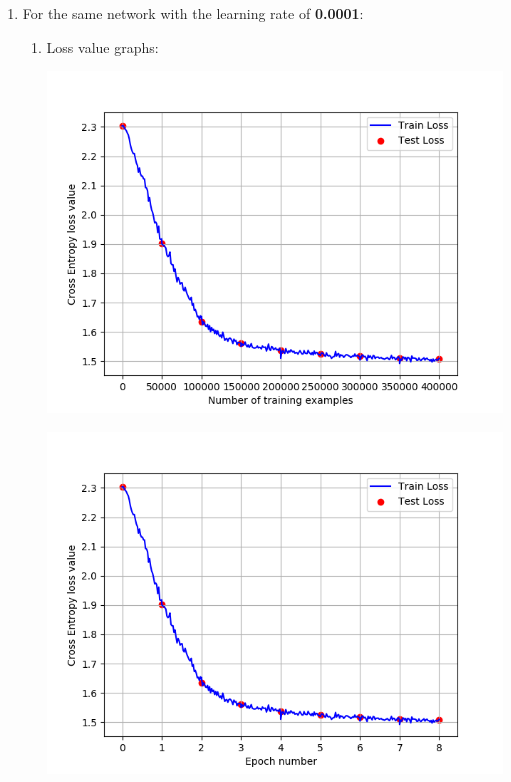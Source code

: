 \documentclass[a4paper]{iacas}
\begin{document}
\begin{enumerate}
\begin{enumerate}
\end{enumerate}

\item For the same network with the learning rate of \textbf{0.0001}:


\begin{enumerate}

\item Loss value graphs:

\vskip 0.1in
\begin{minipage}{\linewidth}
	\includegraphics[scale=0.8]{hw2_py/results/_14_01_43/lr_0_0001_net_1_CE_/loss_value.png}
	\label{fig_9}
\end{minipage}
\vskip 0.1in
\begin{minipage}{\linewidth}
	\includegraphics[scale=0.8]{hw2_py/results/_14_01_43/lr_0_0001_net_1_CE_/loss_value_epoch.png}
	\label{fig_10}
\end{minipage}
\vskip 0.1in


\end{enumerate}
\end{enumerate}
\end{document}
